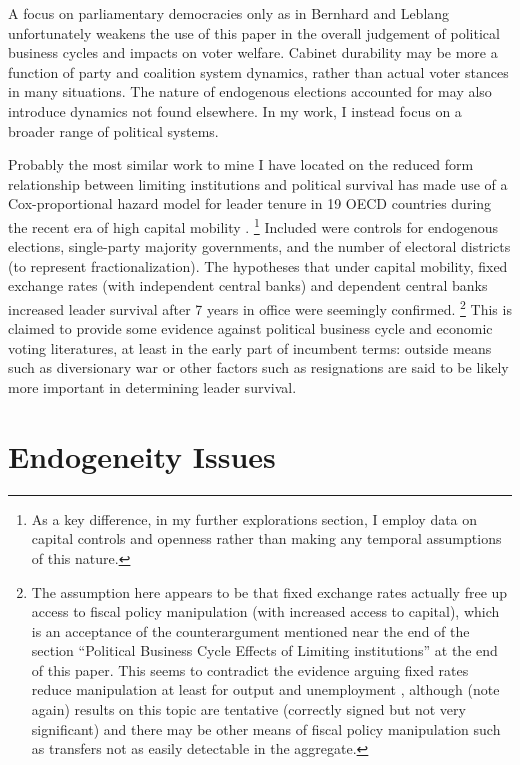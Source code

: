 \documentclass{article}
\begin{document}
    A focus on parliamentary democracies only as in Bernhard and Leblang unfortunately weakens the use of this paper in the overall judgement of political business cycles and impacts on voter welfare. Cabinet durability may be more a function of party and coalition system dynamics, rather than actual voter stances in many situations. The nature of endogenous elections accounted for may also introduce dynamics not found elsewhere. In my work, I instead focus on a broader range of political systems.
    
    Probably the most similar work to mine I have located on the reduced form relationship between limiting institutions and political survival has made use of a Cox-proportional hazard model for leader tenure in 19 OECD countries during the recent era of high capital mobility \citep{clark_monetary_2013}. \footnote{As a key difference, in my further explorations section, I employ data on capital controls and openness rather than making any temporal assumptions of this nature.} Included were controls for endogenous elections, single-party majority governments, and the number of electoral districts (to represent fractionalization). The hypotheses that under capital mobility, fixed exchange rates (with independent central banks) and dependent central banks increased leader survival after 7 years in office were seemingly confirmed. \footnote{The assumption here appears to be that fixed exchange rates actually free up access to fiscal policy manipulation (with increased access to capital), which is an acceptance of the counterargument mentioned near the end of the section “Political Business Cycle Effects of Limiting institutions” at the end of this paper. This seems to contradict the evidence arguing fixed rates reduce manipulation at least for output and unemployment \citep{clark_international_1998}, although (note again) results on this topic are tentative (correctly signed but not very significant) and there may be other means of fiscal policy manipulation such as transfers not as easily detectable in the aggregate.} This is claimed to provide some evidence against political business cycle and economic voting literatures, at least in the early part of incumbent terms: outside means such as diversionary war or other factors such as resignations are said to be likely more important in determining leader survival.

    \section*{Endogeneity Issues}
\end{document}
